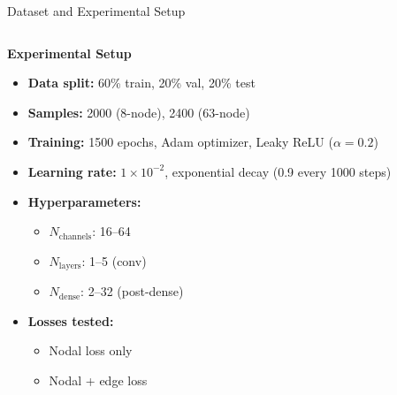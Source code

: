 \documentclass[hyperref={colorlinks,citecolor=blue,linkcolor=blue,urlcolor=blue}]{beamer}
\begin{document}
\begin{frame}{Dataset and Experimental Setup}
\begin{columns}[t,onlytextwidth]
    \begin{column}{0.43\textwidth}
        \scriptsize
        \textbf{Experimental Setup}
        \begin{itemize}
            \item \textbf{Data split:} 60\% train, 20\% val, 20\% test
            \item \textbf{Samples:} 2000 (8-node), 2400 (63-node)
            \item \textbf{Training:} 1500 epochs, Adam optimizer, Leaky ReLU ($\alpha=0.2$)
            \item \textbf{Learning rate:} $1\times10^{-2}$, exponential decay (0.9 every 1000 steps)
            \item \textbf{Hyperparameters:}
            \begin{itemize}
                \scriptsize
                \item $N_{\text{channels}}$: 16–64
                \item $N_{\text{layers}}$: 1–5 (conv)
                \item $N_{\text{dense}}$: 2–32 (post-dense)
            \end{itemize}
            \item \textbf{Losses tested:}
            \begin{itemize}
                \scriptsize
                \item Nodal loss only
                \item Nodal + edge loss
            \end{itemize}
        \end{itemize}
    \end{column}
\end{columns}
\end{frame}
\end{document}
